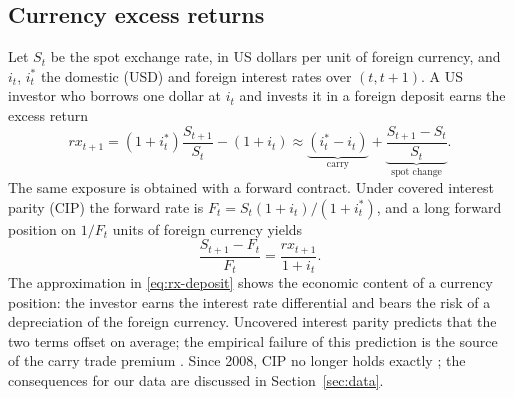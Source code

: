 \subsection{Currency excess returns}

Let $S_t$ be the spot exchange rate, in US dollars per unit of foreign currency, and $i_t$, $i_t^*$ the domestic (USD) and foreign interest rates over $(t,t+1)$.
A US investor who borrows one dollar at $i_t$ and invests it in a foreign deposit earns the excess return
\begin{equation}\label{eq:rx-deposit}
  rx_{t+1} = (1 + i_t^*)\frac{S_{t+1}}{S_t} - (1 + i_t)
  \approx \underbrace{(i_t^* - i_t)}_{\text{carry}} + \underbrace{\frac{S_{t+1} - S_t}{S_t}}_{\text{spot change}}.
\end{equation}
The same exposure is obtained with a forward contract.
Under covered interest parity (CIP) the forward rate is $F_t = S_t (1 + i_t)/(1 + i_t^*)$, and a long forward position on $1/F_t$ units of foreign currency yields
\begin{equation}\label{eq:rx-forward}
  \frac{S_{t+1} - F_t}{F_t} = \frac{rx_{t+1}}{1 + i_t}.
\end{equation}
The approximation in \eqref{eq:rx-deposit} shows the economic content of a currency position: the investor earns the interest rate differential and bears the risk of a depreciation of the foreign currency.
Uncovered interest parity predicts that the two terms offset on average; the empirical failure of this prediction is the source of the carry trade premium \citep{lustig2011}.
Since 2008, CIP no longer holds exactly \citep{du2018}; the consequences for our data are discussed in Section~\ref{sec:data}.
